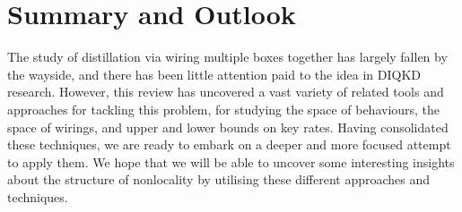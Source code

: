\documentclass[10pt, a4paper]{article}
\numberwithin{equation}{section} %
\theoremstyle{definition}
\theoremstyle{plain}
\newcommand{\?}{\mathrel{?}} %
\begin{document}
    \section{Summary and Outlook}

    The study of distillation via wiring multiple boxes together has largely fallen by the wayside, and there has been little attention paid to the idea in DIQKD research. However, this review has uncovered a vast variety of related tools and approaches for tackling this problem, for studying the space of behaviours, the space of wirings, and upper and lower bounds on key rates. Having consolidated these techniques, we are ready to embark on a deeper and more focused attempt to apply them. We hope that we will be able to uncover some interesting insights about the structure of nonlocality by utilising these different approaches and techniques.

    \printbibliography{}
\end{document}
